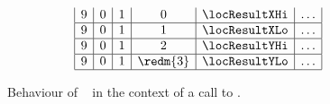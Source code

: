 \begin{figure}[h!]
\begin{adjustwidth}{-2cm}{-2cm}
\[\begin{array}{|c|c|c|c|c|c|c|}
                9 & 0      & 1      & 0           & \locResultXHi & \hdots                                                                                                                        \\ \hline
                9 & 0      & 1      & 1           & \locResultXLo & \hdots                                                                                                                        \\ \hline
                9 & 0      & 1      & 2           & \locResultYHi & \hdots                                                                                                                        \\ \hline
                9 & 0      & 1      & \redm{3}    & \locResultYLo & \hdots                                                                                                                        \\ \hline
            \end{array}
        \]
    \end{adjustwidth}
    \caption{Behaviour of \hurdle~ in the context of a call to .}
\end{figure}

